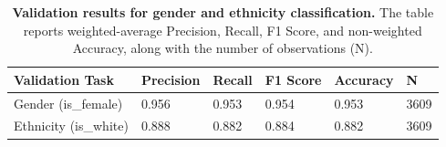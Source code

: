 
\begin{table}[htb]\centering
\begin{tabular}{p{4cm}lllll}
\hline
\textbf{Validation Task} & \textbf{Precision} & \textbf{Recall} & \textbf{F1 Score} & \textbf{Accuracy} & \textbf{N} \\
\hline
Gender (is\_female) & 0.956 & 0.953 & 0.954 & 0.953 & 3609 \\
Ethnicity (is\_white) & 0.888 & 0.882 & 0.884 & 0.882 & 3609 \\
\hline
\end{tabular}
\caption{\textbf{Validation results for gender and ethnicity classification.} The table reports weighted-average Precision, Recall, F1 Score, and non-weighted Accuracy, along with the number of observations (N).}
\label{tab:validation_metrics}
\end{table}
